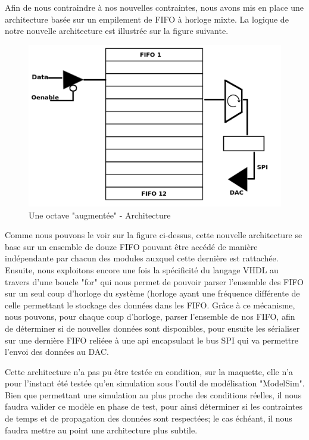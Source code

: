 \documentclass[french,a4paper,12pt]{report}
\begin{document}
		Afin de nous contraindre à nos nouvelles contraintes, nous avons mis en place une architecture basée sur un empilement de FIFO à horloge mixte. La logique de notre nouvelle architecture est illustrée sur la figure suivante.
		
	\begin{figure}[!ht]
    \center
  	\includegraphics[width=12cm]{octave.png}
		\caption{Une octave "augmentée" - Architecture}
	\end{figure}
		
		Comme nous pouvons le voir sur la figure ci-dessus, cette nouvelle architecture se base sur un ensemble de douze FIFO pouvant être accédé de manière indépendante par chacun des modules auxquel cette dernière est rattachée. Ensuite, nous exploitons encore une fois la spécificité du langage VHDL au travers d'une boucle "for" qui nous permet de pouvoir parser l'ensemble des FIFO sur un seul coup d'horloge du système (horloge ayant une fréquence différente de celle permettant le stockage des données dans les FIFO.
		Grâce à ce mécanisme, nous pouvons, pour chaque coup d'horloge, parser l'ensemble de nos FIFO, afin de déterminer si de nouvelles données sont disponibles, pour ensuite les sérialiser sur une dernière FIFO reliéee à une api encapsulant le bus SPI qui va permettre l'envoi des données au DAC.
		
		Cette architecture n'a pas pu être testée en condition, sur la maquette, elle n'a pour l'instant été testée qu'en simulation sous l'outil de modélisation "ModelSim". Bien que permettant une simulation au plus proche des conditions réelles, il nous faudra valider ce modèle en phase de test, pour ainsi déterminer si les contraintes de temps et de propagation des données sont respectées; le cas échéant, il nous faudra mettre au point une architecture plus subtile.
		
\end{document}
